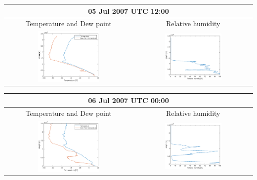 \documentclass{article}
\begin{document}
\begin{tabular}{c c}
\multicolumn{2}{c}{\textbf{05 Jul 2007 UTC 12:00}}\\ \hline
Temperature and Dew point & Relative humidity \\ \hline
\includegraphics[width=0.5\textwidth]{figures/3plot2a.eps} & \includegraphics[width=0.5\textwidth]{figures/3plot2b.eps} 

\end{tabular}

\begin{tabular}{c c}
\multicolumn{2}{c}{\textbf{06 Jul 2007 UTC 00:00}}\\ \hline
Temperature and Dew point & Relative humidity \\ \hline
\includegraphics[width=0.5\textwidth]{figures/3plot3a.eps} & \includegraphics[width=0.5\textwidth]{figures/3plot3b.eps} 

\end{tabular}
\end{document}
